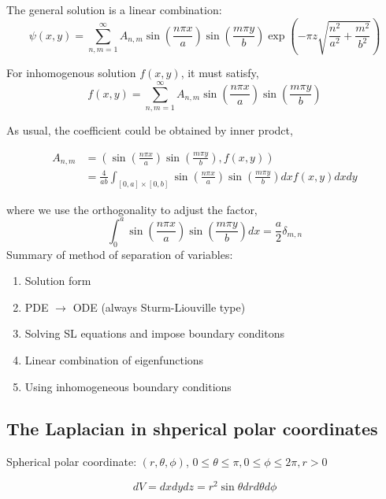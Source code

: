 \documentclass{article}
\theoremstyle{definition}
\begin{document}
The general solution is a linear combination:
\begin{equation}
\psi(x,y)=\sum_{n,m=1}^{\infty} A_{n,m}\sin\left(\frac{n\pi x}{a}\right)\sin \left(\frac{m\pi y}{b}\right)\exp\left(-\pi z \sqrt{\frac{n^2}{a^2}+\frac{m^2}{b^2}}\right)
\end{equation}

For inhomogenous solution $f(x,y)$, it must satisfy,
\begin{equation}
f(x,y)=\sum_{n,m=1}^{\infty} A_{n,m}\sin\left(\frac{n\pi x}{a}\right)\sin \left(\frac{m\pi y}{b}\right)
\end{equation}

As usual, the coefficient could be obtained by inner prodct,

\begin{align}
A_{n,m}&=\left(\sin\left(\frac{n\pi x}{a}\right)\sin \left(\frac{m\pi y}{b}\right), f(x,y)\right)\\
	   &=\frac{4}{ab}\int_{[0,a]\times [0,b]}\sin\left(\frac{n\pi x}{a}\right)\sin \left(\frac{m\pi y}{b}\right) dx f(x,y)dxdy
\end{align}

where we use the orthogonality to adjust the factor,
\begin{equation}
\int_0^a\sin\left(\frac{n\pi x}{a}\right)\sin \left(\frac{m\pi y}{b}\right)dx=\frac{a}{2}\delta_{m,n}
\end{equation}
Summary of method of separation of variables:
\begin{enumerate}
	\item Solution form
	\item PDE $\to$ ODE (always Sturm-Liouville type)
	\item Solving SL equations and impose boundary conditons
	\item Linear combination of eigenfunctions
	\item Using inhomogeneous boundary conditions
\end{enumerate}


\subsection{The Laplacian in shperical polar coordinates}

Spherical polar coordinate: $(r,\theta, \phi)$, $0\leq \theta \leq \pi, 0\leq \phi \leq 2\pi, r>0$

\begin{equation}
dV=dx dy dz=r^2\sin \theta dr d\theta d\phi
\end{equation}
\end{document}
